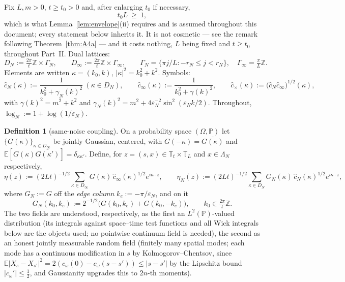 \documentclass[11pt,a4paper]{article}
\theoremstyle{plain}
\theoremstyle{definition}
\newtheorem{definition}[theorem]{Definition}
\newcommand{\Z}{\mathbb{Z}}
\newcommand{\T}{\mathbb{T}}
\newcommand{\E}{\mathbb{E}}
\newcommand{\PP}{\mathbb{P}}
\newcommand{\eps}{\varepsilon}
\begin{document}
Fix $L,m>0$, $t\ge t_0>0$ and, after enlarging $t_0$ if necessary,
\begin{equation}
 t_0L\ \ge\ 1 ,
 \tag{$\star$}\label{eq:tLstar}
\end{equation}
which is what Lemma~\ref{lem:envelope}(ii) requires and is assumed throughout this
document; every statement below inherits it. It is not cosmetic --- see the remark
following Theorem~\ref{thm:A4a} --- and it costs nothing, $L$ being fixed and $t\ge t_0$
throughout Part~II. Dual lattices:
\[
 D_N:=\tfrac{2\pi}t\Z\times\Gamma_N,\qquad
 D_\infty:=\tfrac{2\pi}t\Z\times\Gamma_\infty,\qquad
 \Gamma_N=\{\pi j/L:-r_N\le j<r_N\},\quad
 \Gamma_\infty=\tfrac\pi L\Z .
\]
Elements are written $\kappa=(k_0,k)$, $|\kappa|^2=k_0^2+k^2$. Symbols:
\begin{equation}
 \hat c_N(\kappa):=\frac1{k_0^2+\gamma_N(k)^2}\ (\kappa\in D_N),\qquad
 \hat c_\infty(\kappa):=\frac1{k_0^2+\gamma(k)^2},\qquad
 \hat c_\times(\kappa):=\bigl(\hat c_N\hat c_\infty\bigr)^{1/2}(\kappa),
 \label{eq:symbols}
\end{equation}
with $\gamma(k)^2=m^2+k^2$ and $\gamma_N(k)^2=m^2+4\eps_N^{-2}
\sin^2(\eps_Nk/2)$. Throughout, $\log_N:=1+\log(1/\eps_N)$.

\begin{definition}[same-noise coupling]\label{def:coupling}
On a probability space $(\Omega,\PP)$ let $\{G(\kappa)\}_{\kappa\in D_\infty}$
be jointly Gaussian, centered, with
$G(-\kappa)=\overline{G(\kappa)}$ and
$\E[G(\kappa)\overline{G(\kappa')}]=\delta_{\kappa\kappa'}$. Define, for
$z=(s,x)\in\T_t\times\T_L$ and $x\in\Lambda_N$ respectively,
\[
 \eta(z):=(2Lt)^{-1/2}\!\!\sum_{\kappa\in D_\infty}\!\!
 G(\kappa)\,\hat c_\infty(\kappa)^{1/2}e^{i\kappa\cdot z},
 \qquad
 \eta_N(z):=(2Lt)^{-1/2}\!\!\sum_{\kappa\in D_N}\!\!
 G_N(\kappa)\,\hat c_N(\kappa)^{1/2}e^{i\kappa\cdot z},
\]
where $G_N:=G$ off the \emph{edge column} $k_e:=-\pi/\eps_N$, and on it
\[
 G_N(k_0,k_e):=2^{-1/2}\bigl(G(k_0,k_e)+G(k_0,-k_e)\bigr),
 \qquad k_0\in\tfrac{2\pi}t\Z .
\]
The two fields are understood, respectively, as
the first an $L^2(\PP)$-valued distribution (its integrals against
space--time test functions and all Wick integrals below are the objects used;
no pointwise continuum field is needed), the second as an honest jointly
measurable random field (finitely many spatial modes; each mode has a
continuous modification in $s$ by Kolmogorov--Chentsov, since
$\E|X_s-X_{s'}|^2=2(c_\omega(0)-c_\omega(s-s'))\le|s-s'|$ by the Lipschitz
bound $|c_\omega'|\le\tfrac12$, and Gaussianity upgrades this to
$2n$-th moments).
\end{definition}
\end{document}
